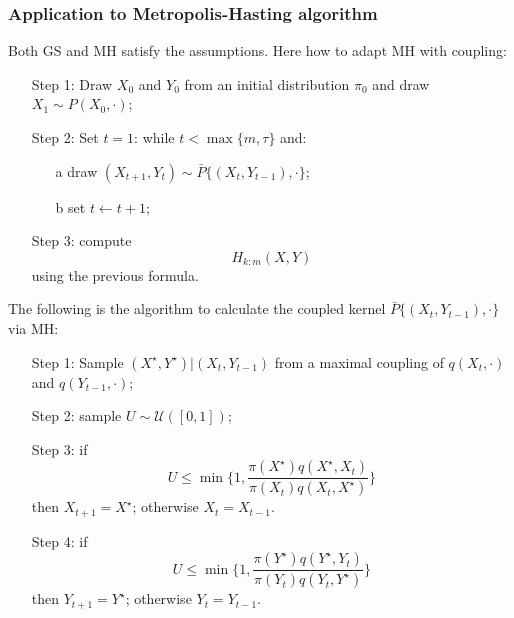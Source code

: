 \documentclass[9pt]{beamer}
\begin{document}
\begin{frame}
	\frametitle{Application to Metropolis-Hasting algorithm}
	Both GS and MH satisfy the assumptions. Here how to adapt MH with coupling:
	
	\begin{itemize}
		\item[Step 1:] Draw $X_0$ and $Y_0$ from an initial distribution $\pi_0$ and draw $X_1 \sim P(X_0, \cdot)$;
		\item[Step 2:]Set $t=1$: while $t<\max\{m,\tau\}$ and:
		\begin{itemize}
			\item[a] draw $(X_{t+1}, Y_t)\sim \bar P \{(X_t, Y_{t-1}), \cdot \}$;
			\item[b] set $t \leftarrow t+1$;
		\end{itemize}
		\item[Step 3:] compute 
		$$ H_{k:m}(X,Y)$$
		using the previous formula.
	\end{itemize}
	
	The following is the algorithm to calculate the coupled kernel $\bar P \{(X_t, Y_{t-1}), \cdot \}$ via MH:
	
	
	\begin{itemize}
		\item[Step 1:] Sample $(X^\star, Y^\star) | (X_t, Y_{t-1})$ from a maximal coupling of $q(X_t, \cdot)$ and $q(Y_{t-1}, \cdot)$;
		\item[Step 2:] sample $U \sim \mathcal{U}([0,1])$;
		\item[Step 3:] if
		$$ U
		\leq \min\bigg \{
		1,
		\frac{ \pi(X^\star)q(X^\star,X_t)}{
		\pi(X_t)q(X_t, X^\star)}
		\bigg \}
		$$
		then $X_{t+1} = X^\star$; otherwise $X_t = X_{t-1}$.
		\item[Step 4:] if
		$$ U
		\leq \min\bigg \{ 
		1,
		\frac{ \pi(Y^\star)q(Y^\star,Y_t)}{
			\pi(Y_t)q(Y_t, Y^\star)}
		\bigg \}
		$$
		then $Y_{t+1} = Y^\star$; otherwise $Y_t = Y_{t-1}$.
		
	\end{itemize}
\end{frame}
\end{document}
